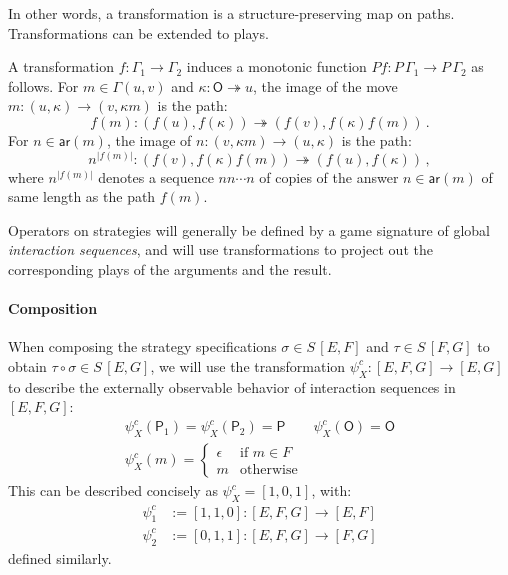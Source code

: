 \documentclass[sigplan,screen]{acmart}
\newcommand{\kw}[1]{\ensuremath{ \mathsf{#1} }}
\begin{document}
In other words,
a transformation
is a structure-preserving map on paths.
Transformations can be extended to plays.

\begin{definition}
A transformation
$f : \Gamma_1 \rightarrow \Gamma_2$
induces a monotonic function
$P f  : P \, \Gamma_1 \rightarrow P \, \Gamma_2$
as follows.
For $m \in \Gamma(u, v)$ and $\kappa : \kw{O} \twoheadrightarrow u$,
the image of the move
$m : (u, \kappa) \rightarrow (v, \kappa m)$
is the path:
\[
 f(m) : (f(u), f(\kappa)) \twoheadrightarrow
        (f(v), f(\kappa) f(m)) \,.
\]
For $n \in \kw{ar}(m)$,
the image of
$n : (v, \kappa m) \rightarrow (u, \kappa)$
is the path:
\[
 n^{|f(m)|} : (f(v), f(\kappa) f(m)) \twoheadrightarrow
              (f(u), f(\kappa)) \,,
\]
where $n^{|f(m)|}$ denotes a sequence $nn \cdots n$
of copies of the answer $n \in \kw{ar}(m)$
of same length as the path $f(m)$.
\end{definition}

Operators on strategies will generally be defined
by a game signature of global \emph{interaction sequences},
and will use transformations to project out
the corresponding plays of the arguments and the result.

\paragraph{Composition} %

When composing the strategy specifications
$\sigma \in S \, [E, F]$ and
$\tau \in S \, [F, G]$
to obtain $\tau \circ \sigma \in S \, [E, G]$,
we will use the transformation
$\psi^c_X : [E,F,G] \rightarrow [E,G]$
to describe the externally observable behavior
of interaction sequences in $[E,F,G]$:
\begin{gather*}
  \psi^c_X(\kw{P}_1) = \psi^c_X(\kw{P}_2) = \kw{P} \qquad
  \psi^c_X(\kw{O}) = \kw{O}
  \\
  \psi^c_X(m) = \begin{cases}
    \epsilon & \text{if } m \in F \\
    m & \text{otherwise}
  \end{cases}
\end{gather*}
This can be described concisely as
$\psi^c_X = [1,0,1]$,
with:
\begin{align*}
  \psi^c_1 &:= [1,1,0] :
    [E,F,G] \rightarrow [E,F] \\
  \psi^c_2 &:= [0,1,1] :
     [E,F,G] \rightarrow [F,G]
\end{align*}
defined similarly.
\end{document}

